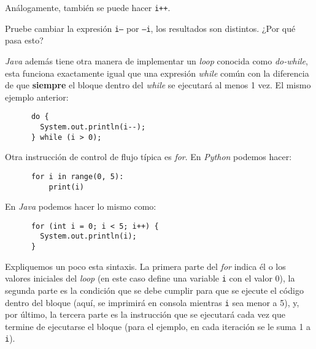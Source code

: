   Análogamente, también se puede hacer \texttt{i++}.

  \begin{exercise}
    Pruebe cambiar la expresión \texttt{i--} por \texttt{--i}, los 
    resultados son distintos. 
    ¿Por qué pasa esto?
  \end{exercise}

  \textit{Java} además tiene otra manera de implementar un \textit{loop} conocida como 
  \textit{do-while}, esta funciona exactamente igual que una expresión \textit{while} 
  común con la diferencia de que \textbf{siempre} el bloque dentro del \textit{while} se
  ejecutará al menos 1 vez.
  El mismo ejemplo anterior:

  \begin{listing}[ht!]
    \begin{verbatim}
      do {
        System.out.println(i--);
      } while (i > 0);
    \end{verbatim}
  \end{listing}

  Otra instrucción de control de flujo típica es \textit{for}. 
  En \textit{Python} podemos hacer:

  \begin{listing}[ht!]
    \begin{verbatim}
      for i in range(0, 5):
          print(i)
    \end{verbatim}
  \end{listing}
  
  En \textit{Java} podemos hacer lo mismo como:

  \begin{listing}[ht!]
    \begin{verbatim}
      for (int i = 0; i < 5; i++) {
        System.out.println(i);
      }
    \end{verbatim}
  \end{listing}

  Expliquemos un poco esta sintaxis.
  La primera parte del \textit{for} indica él o los valores iniciales del \textit{loop} 
  (en este caso define una variable \texttt{i} con el valor 0), la segunda parte es la 
  condición que se debe cumplir para que se ejecute el código dentro del bloque (aquí, se 
  imprimirá en consola mientras \texttt{i} sea menor a 5), y, por último, la tercera parte
  es la instrucción que se ejecutará cada vez que termine de ejecutarse el bloque (para el 
  ejemplo, en cada iteración se le suma 1 a \texttt{i}).

